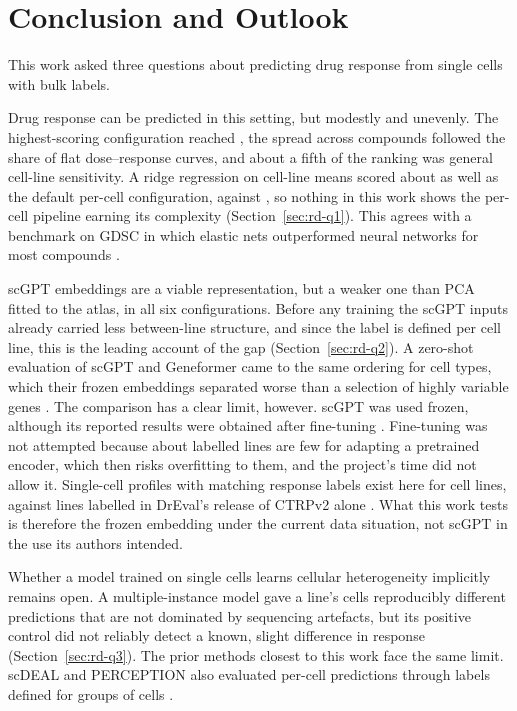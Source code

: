 \chapter{Conclusion and Outlook}
\label{sec:conclusion}

This work asked three questions about predicting drug response from single cells with bulk labels.

Drug response can be predicted in this setting, but modestly and unevenly. The highest-scoring
configuration reached \SpBest{}, the spread across compounds followed the share of flat dose--response
curves, and about a fifth of the ranking was general cell-line sensitivity. A ridge regression on
cell-line means scored about as well as the default per-cell configuration, \RidgePca{} against
\SwPcaMaeZero{}, so nothing in this work shows the per-cell pipeline earning its complexity
(Section~\ref{sec:rd-q1}). This agrees with a benchmark on GDSC in which elastic nets outperformed
neural networks for most compounds \cite{eckhart2024}.

scGPT embeddings are a viable representation, but a weaker one than PCA fitted to the atlas, in all six
configurations. Before any training the scGPT inputs already carried less between-line structure, and
since the label is defined per cell line, this is the leading account of the gap (Section~\ref{sec:rd-q2}).
A zero-shot evaluation of scGPT and Geneformer came to the same ordering for cell types, which their
frozen embeddings separated worse than a selection of highly variable genes \cite{kedzierska2025}. The
comparison has a clear limit, however. scGPT was used frozen, although its reported results were
obtained after fine-tuning \cite{scgpt}. Fine-tuning was not attempted because about \NLinesCV{}
labelled lines are few for adapting a pretrained encoder, which then risks overfitting to them, and the project's time did not allow it.
Single-cell profiles with matching response labels exist here for \NLines{} cell lines, against
\NCtrpLines{} lines labelled in DrEval's release of CTRPv2 alone \cite{dreval_data}. What this work tests is therefore the
frozen embedding under the current data situation, not scGPT in the use its authors intended.

Whether a model trained on single cells learns cellular heterogeneity implicitly remains open. A
multiple-instance model gave a line's cells reproducibly different predictions that are not dominated by
sequencing artefacts, but its positive control did not reliably detect a known, slight difference in
response (Section~\ref{sec:rd-q3}). The prior methods closest to this work face the same limit. scDEAL
and PERCEPTION also evaluated per-cell predictions through labels defined for groups of cells
\cite{scdeal,perception}.

